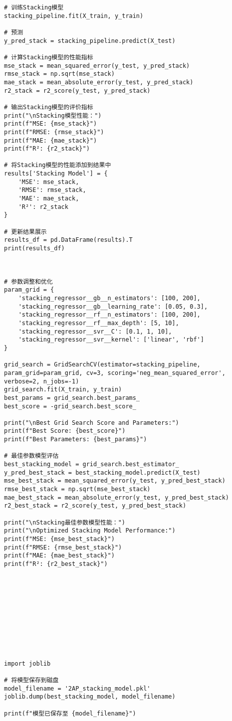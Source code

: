 \documentclass[bwprint,fontset=windows]{gmcmthesis}
\begin{document}
\begin{lstlisting}
# 训练Stacking模型
stacking_pipeline.fit(X_train, y_train)

# 预测
y_pred_stack = stacking_pipeline.predict(X_test)

# 计算Stacking模型的性能指标
mse_stack = mean_squared_error(y_test, y_pred_stack)
rmse_stack = np.sqrt(mse_stack)
mae_stack = mean_absolute_error(y_test, y_pred_stack)
r2_stack = r2_score(y_test, y_pred_stack)

# 输出Stacking模型的评价指标
print("\nStacking模型性能：")
print(f"MSE: {mse_stack}")
print(f"RMSE: {rmse_stack}")
print(f"MAE: {mae_stack}")
print(f"R²: {r2_stack}")

# 将Stacking模型的性能添加到结果中
results['Stacking Model'] = {
	'MSE': mse_stack,
	'RMSE': rmse_stack,
	'MAE': mae_stack,
	'R²': r2_stack
}

# 更新结果展示
results_df = pd.DataFrame(results).T
print(results_df)



# 参数调整和优化
param_grid = {
	'stacking_regressor__gb__n_estimators': [100, 200],
	'stacking_regressor__gb__learning_rate': [0.05, 0.3],
	'stacking_regressor__rf__n_estimators': [100, 200],
	'stacking_regressor__rf__max_depth': [5, 10],
	'stacking_regressor__svr__C': [0.1, 1, 10],
	'stacking_regressor__svr__kernel': ['linear', 'rbf']
}

grid_search = GridSearchCV(estimator=stacking_pipeline, param_grid=param_grid, cv=3, scoring='neg_mean_squared_error', verbose=2, n_jobs=-1)
grid_search.fit(X_train, y_train)
best_params = grid_search.best_params_
best_score = -grid_search.best_score_

print("\nBest Grid Search Score and Parameters:")
print(f"Best Score: {best_score}")
print(f"Best Parameters: {best_params}")

# 最佳参数模型评估
best_stacking_model = grid_search.best_estimator_
y_pred_best_stack = best_stacking_model.predict(X_test)
mse_best_stack = mean_squared_error(y_test, y_pred_best_stack)
rmse_best_stack = np.sqrt(mse_best_stack)
mae_best_stack = mean_absolute_error(y_test, y_pred_best_stack)
r2_best_stack = r2_score(y_test, y_pred_best_stack)

print("\nStacking最佳参数模型性能：")
print("\nOptimized Stacking Model Performance:")
print(f"MSE: {mse_best_stack}")
print(f"RMSE: {rmse_best_stack}")
print(f"MAE: {mae_best_stack}")
print(f"R²: {r2_best_stack}")











import joblib

# 将模型保存到磁盘
model_filename = '2AP_stacking_model.pkl'
joblib.dump(best_stacking_model, model_filename)

print(f"模型已保存至 {model_filename}")

\end{lstlisting}
\end{document}
